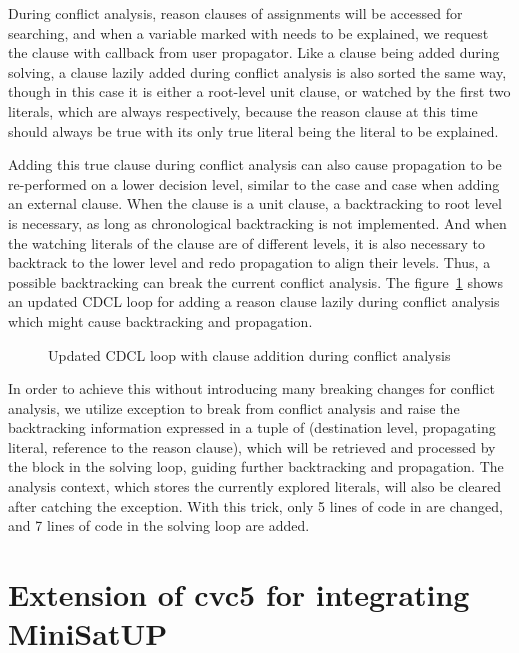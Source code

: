 During conflict analysis, reason clauses of assignments will be accessed for searching, and when a variable marked with  needs to be explained, we request the clause with callback  from user propagator. Like a clause being added during solving, a clause lazily added during conflict analysis is also sorted the same way, though in this case it is either a root-level unit clause, or watched by the first two literals, which are always  respectively, because the reason clause at this time should always be true with its only true literal being the literal to be explained.

Adding this true clause during conflict analysis can also cause propagation to be re-performed on a lower decision level, similar to the  case and  case when adding an external clause. When the clause is a unit clause, a backtracking to root level is necessary, as long as chronological backtracking is not implemented. And when the watching literals of the clause are of different levels, it is also necessary to backtrack to the lower level and redo propagation to align their levels. Thus, a possible backtracking can break the current conflict analysis. The figure~\ref{fig:analyze} shows an updated CDCL loop for adding a reason clause lazily during conflict analysis which might cause backtracking and propagation.

\begin{figure}[!htbp]
  \centering
  
  \caption{Updated CDCL loop with clause addition during conflict analysis}
  \label{fig:analyze}
\end{figure}

In order to achieve this without introducing many breaking changes for conflict analysis, we utilize  exception to break from conflict analysis and raise the backtracking information expressed in a tuple of (destination level, propagating literal, reference to the reason clause), which will be retrieved and processed by the  block in the solving loop, guiding further backtracking and propagation. The analysis context, which stores the currently explored literals, will also be cleared after catching the exception. With this trick, only 5 lines of code in  are changed, and 7 lines of code in the solving loop are added.

\section{Extension of cvc5 for integrating MiniSatUP}

